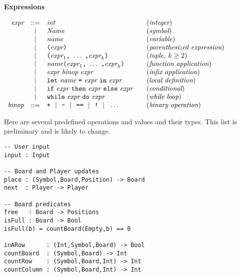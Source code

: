 \documentclass[11pt]{article}
\makeatletter
\newcommand{\prodName}[1]{&(\emph{#1})\\}
\newcommand{\nt}[1]{\textit{#1}}
\newcommand{\prog}[1]{\texttt{#1}}
\newcommand{\ORil}{\ \ |\ \ }
\newcommand{\IS}{&::=&}
\newcommand{\OR}{&|&}
\newcommand{\syntax}[2]{
  \needspace{3\baselineskip}
  \bigskip\par\noindent\textbf{#1}\par\smallskip%
  $\begin{array}{rcl@{\qquad}l}#2\end{array}$%
  \par\bigskip\noindent\ignorespaces
}
\newcommand{\lp}{\prog{(}}
\newcommand{\rp}{\prog{)}}
\newcommand{\paren}[1]{\lp#1\rp}
\makeatother
\begin{document}
\syntax{Expressions}{
\nt{expr}     \IS  \nt{int}                                 \prodName{integer}
              \OR  \nt{Name}                                 \prodName{symbol}
              \OR  \nt{name}                               \prodName{variable}
              \OR  \paren{\nt{expr}}       \prodName{parenthesized expression}
              \OR  \paren{\nt{expr}_1\prog{,}\ \ldots\ \prog{,}\nt{expr}_k}
                                                    \prodName{tuple, $k\geq 2$}
              \OR  \nt{name}\paren{\nt{expr}_1\prog{,}\ \ldots\
                                              \prog{,}\nt{expr}_k}
                                               \prodName{function application}
              \OR  \nt{expr}\ \nt{binop}\ \nt{expr}
                                                  \prodName{infix application}
             \OR  \prog{let}\ \nt{name}\ \prog{=}\ \nt{expr}\
                   \prog{in}\ \nt{expr}            \prodName{local definition}
              \OR  \prog{if}\ \nt{expr}\ \prog{then}\ \nt{expr}\
                   \prog{else}\ \nt{expr}               \prodName{conditional}
              \OR  \prog{while}\ \nt{expr}\ \prog{do}\ \nt{expr}
                                                         \prodName{while loop}
%
\nt{binop}    \IS  \prog{+} \ORil \prog{-} \ORil
                   \prog{==} \ORil \prog{!} \ORil \ldots
                                                   \prodName{binary operation}
}
%
%
%
Here are several predefined operations and values and their types. This list is preliminary and is likely to change.

\begin{verbatim}
-- User input
input : Input

-- Board and Player updates
place : (Symbol,Board,Position) -> Board
next  : Player -> Player

-- Board predicates
free   : Board -> Positions
isFull : Board -> Bool
isFull(b) = countBoard(Empty,b) == 0

inARow      : (Int,Symbol,Board) -> Bool
countBoard  : (Symbol,Board) -> Int
countRow    : (Symbol,Board,Int) -> Int
countColumn : (Symbol,Board,Int) -> Int
\end{verbatim}


\end{document}
